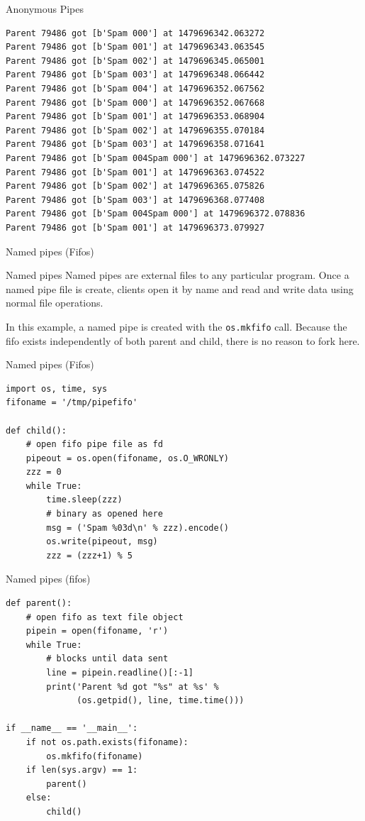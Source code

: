 \documentclass[xcolor=dvipsnames, 10pt, presentation,aspectratio=169]{beamer}
\begin{document}
\begin{frame}[label={sec:orga26e804},fragile]{Anonymous Pipes}
 \begin{verbatim}
Parent 79486 got [b'Spam 000'] at 1479696342.063272
Parent 79486 got [b'Spam 001'] at 1479696343.063545
Parent 79486 got [b'Spam 002'] at 1479696345.065001
Parent 79486 got [b'Spam 003'] at 1479696348.066442
Parent 79486 got [b'Spam 004'] at 1479696352.067562
Parent 79486 got [b'Spam 000'] at 1479696352.067668
Parent 79486 got [b'Spam 001'] at 1479696353.068904
Parent 79486 got [b'Spam 002'] at 1479696355.070184
Parent 79486 got [b'Spam 003'] at 1479696358.071641
Parent 79486 got [b'Spam 004Spam 000'] at 1479696362.073227
Parent 79486 got [b'Spam 001'] at 1479696363.074522
Parent 79486 got [b'Spam 002'] at 1479696365.075826
Parent 79486 got [b'Spam 003'] at 1479696368.077408
Parent 79486 got [b'Spam 004Spam 000'] at 1479696372.078836
Parent 79486 got [b'Spam 001'] at 1479696373.079927
\end{verbatim}
\end{frame}

\begin{frame}[label={sec:orgf66a362},fragile]{Named pipes (Fifos)}
 \begin{block}{Named pipes}
Named pipes are external files to any particular program. Once a named
pipe file is create, clients open it by name and read and write data
using normal file operations.
\end{block}

In this example, a named pipe is created with the \texttt{os.mkfifo}
call. Because the fifo exists independently of both parent and child,
there is no reason to fork here.
\end{frame}
\begin{frame}[label={sec:org4ac24ad},fragile]{Named pipes (Fifos)}
 \lstset{language=Python,label= ,caption= ,captionpos=b,numbers=none}
\begin{lstlisting}
import os, time, sys
fifoname = '/tmp/pipefifo' 

def child():
    # open fifo pipe file as fd
    pipeout = os.open(fifoname, os.O_WRONLY)
    zzz = 0
    while True:
        time.sleep(zzz)
        # binary as opened here
        msg = ('Spam %03d\n' % zzz).encode()
        os.write(pipeout, msg)
        zzz = (zzz+1) % 5
\end{lstlisting}
\end{frame}
\begin{frame}[label={sec:org2e55327},fragile]{Named pipes (fifos)}
 \lstset{language=Python,label= ,caption= ,captionpos=b,numbers=none}
\begin{lstlisting}
def parent():
    # open fifo as text file object
    pipein = open(fifoname, 'r') 
    while True:
        # blocks until data sent
        line = pipein.readline()[:-1] 
        print('Parent %d got "%s" at %s' % 
              (os.getpid(), line, time.time()))

if __name__ == '__main__':
    if not os.path.exists(fifoname):
        os.mkfifo(fifoname) 
    if len(sys.argv) == 1:
        parent()          
    else: 
        child()
\end{lstlisting}
\end{frame}
\end{document}
